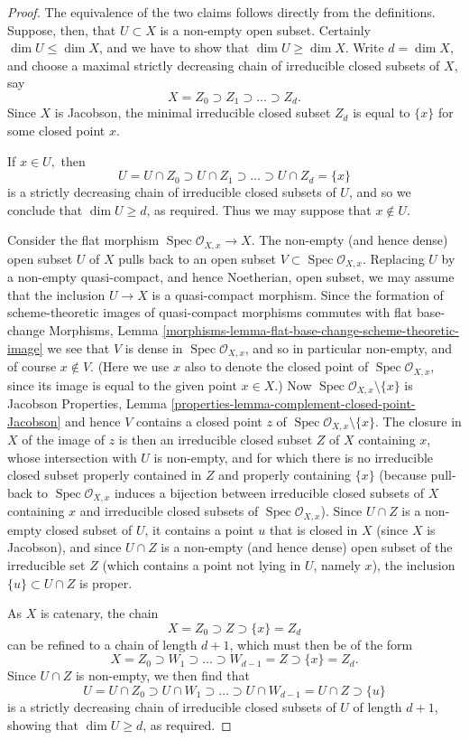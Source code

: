 \documentclass[10pt,a4paper]{amsart}
\theoremstyle{plain}
\theoremstyle{definition}
\theoremstyle{remark}
\numberwithin{equation}{subsection}
\def\Spec{\mathop{\mathrm{Spec}}}
\begin{document}
\begin{proof}
The equivalence of the two claims follows directly from the
definitions.   Suppose, then, that $U\subset X$ is a non-empty open
subset.
Certainly $\dim U \leq \dim X$, and we have to show
that $\dim U \geq \dim X.$
Write $d = \dim X$, and choose a maximal strictly
decreasing chain of irreducible closed subsets
of $X$, say
$$
X = Z_0 \supset Z_1 \supset \ldots \supset Z_d.
$$
Since $X$ is Jacobson, the minimal irreducible closed
subset $Z_d$ is equal to $\{x\}$ for some closed
point $x$.

\medskip\noindent
If $x \in U,$ then
$$
U = U \cap Z_0  \supset U\cap Z_1 \supset \ldots \supset
U\cap Z_d = \{x\}
$$
is a strictly decreasing chain of irreducible closed
subsets of $U$, and so we conclude that $\dim U \geq d$,
as required.  Thus we may suppose that $x \not\in U.$

\medskip\noindent
Consider the flat morphism $\Spec \mathcal{O}_{X,x} \to X$.
The non-empty (and hence dense) open subset $U$ of $X$
pulls back to an open subset $V \subset \Spec \mathcal{O}_{X,x}$.
Replacing $U$ by a non-empty quasi-compact, and hence
Noetherian, open subset, we may assume that the inclusion
$U \to X$ is a quasi-compact morphism.  Since the
formation of scheme-theoretic images of quasi-compact
morphisms commutes with flat base-change
Morphisms, Lemma
\ref{morphisms-lemma-flat-base-change-scheme-theoretic-image}
we see that $V$ is dense in $\Spec \mathcal{O}_{X,x}$,
and so in particular non-empty,
and of course $x \not\in V.$  (Here we use $x$ also to denote
the closed point of $\Spec \mathcal{O}_{X,x}$, since its image
is equal to the given point $x \in X$.)
Now $\Spec \mathcal{O}_{X,x} \setminus \{x\}$ is Jacobson
Properties, Lemma
\ref{properties-lemma-complement-closed-point-Jacobson}
and hence $V$ contains a closed point $z$
of $\Spec \mathcal{O}_{X,x} \setminus \{x\}$.  The closure
in $X$ of the image of $z$ is then an irreducible
closed subset $Z$ of $X$ containing $x$, whose intersection
with $U$ is non-empty, and
for which there is no irreducible closed
subset properly contained in $Z$
and properly containing $\{x\}$
(because pull-back to $\Spec \mathcal{O}_{X,x}$ induces
a bijection between irreducible closed subsets of $X$
containing $x$ and irreducible closed subsets of $\Spec
\mathcal{O}_{X,x}$).
Since $U \cap Z$ is a non-empty closed subset of $U$,
it contains a point $u$ that is closed in $X$ (since
$X$ is Jacobson), and since $U\cap Z$
is a non-empty (and hence dense) open subset of the irreducible set $Z$
(which contains a point not lying in $U$, namely $x$),
the inclusion $\{u\} \subset U\cap Z$ is proper.

\medskip\noindent
As $X$ is catenary, the chain
$$
X = Z_0 \supset Z \supset \{x\} = Z_d
$$
can be refined to a chain of length $d+1$, which must then
be of the form
$$
X = Z_0 \supset W_1 \supset \ldots \supset W_{d-1} = Z \supset \{x\} = Z_d.
$$
Since $U\cap Z$ is non-empty, we then find that
$$
U = U \cap Z_0 \supset U \cap W_1\supset \ldots \supset U\cap W_{d-1}
= U\cap Z \supset \{u\}
$$
is a strictly decreasing chain of irreducible closed subsets
of $U$ of length $d+1$, showing that $\dim U \geq d$,
as required.
\end{proof}
\end{document}
